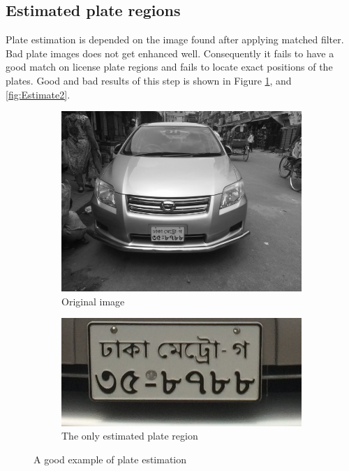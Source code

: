 \subsection{Estimated plate regions}
Plate estimation is depended on the image found after applying matched filter. Bad plate images does not get enhanced well. Consequently it fails to have a good match on license plate regions and fails to locate exact positions of the plates. Good and bad results of this step is shown in Figure \ref{fig:Estimate1}, and \ref{fig:Estimate2}.

\begin{figure}
\begin{subfigure}{0.5\textwidth}
    \centering
    \includegraphics[width=0.9\linewidth]{./img/experiment/stage.2/good}
    \caption{Original image}
\end{subfigure}
\begin{subfigure}{0.5\textwidth}
    \centering
    \includegraphics[width=0.9\linewidth]{./img/experiment/stage.8/00-good}
    \caption{The only estimated plate region}
\end{subfigure}
\caption{A good example of plate estimation}
\label{fig:Estimate1}
\end{figure}


